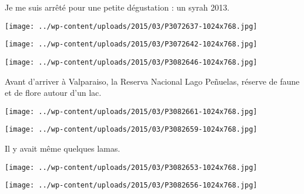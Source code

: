  Je me suis arrêté pour une petite dégustation : un syrah 2013.
\begin{center} \texttt{[image: ../wp-content/uploads/2015/03/P3072637-1024x768.jpg]} \end{center}
\begin{center} \texttt{[image: ../wp-content/uploads/2015/03/P3072642-1024x768.jpg]} \end{center}
\begin{center} \texttt{[image: ../wp-content/uploads/2015/03/P3082646-1024x768.jpg]} \end{center}

\pagebreak
Avant d'arriver à Valparaiso, la Reserva Nacional Lago Peñuelas, réserve de faune et de flore autour d'un lac. 
\begin{center} \texttt{[image: ../wp-content/uploads/2015/03/P3082661-1024x768.jpg]} \end{center}
\begin{center} \texttt{[image: ../wp-content/uploads/2015/03/P3082659-1024x768.jpg]} \end{center}

\pagebreak
 Il y avait même quelques lamas. 
\begin{center} \texttt{[image: ../wp-content/uploads/2015/03/P3082653-1024x768.jpg]} \end{center}
\begin{center} \texttt{[image: ../wp-content/uploads/2015/03/P3082656-1024x768.jpg]} \end{center}